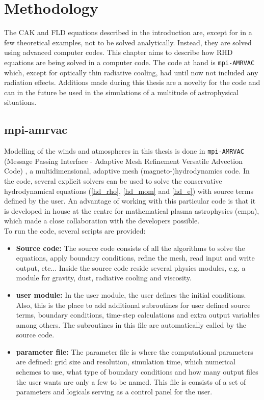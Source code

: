 \chapter{Methodology}
The CAK and FLD equations described in the introduction are, except for in a few theoretical examples, not to be solved analytically. Instead, they are solved using advanced computer codes. This chapter aims to describe how RHD equations are being solved in a computer code. The code at hand is \texttt{mpi-AMRVAC} which, except for optically thin radiative cooling, had until now not included any radiation effects. Additions made during this thesis are a novelty for the code and can in the future be used in the simulations of a multitude of astrophysical situations.

\section{mpi-amrvac} \label{section: methods amrvac}
Modelling of the winds and atmospheres in this thesis is done in \texttt{mpi-AMRVAC} (Message Passing Interface - Adaptive Mesh Refinement Versatile Advection Code) \citep{Porth2014}, a multidimensional, adaptive mesh (magneto-)hydrodynamics code. In the code, several explicit solvers can be used to solve the conservative hydrodynamical equations (\eqref{hd_rho}, \eqref{hd_mom} and \eqref{hd_e}) with source terms defined by the user. An advantage of working with this particular code is that it is developed in house at the centre for mathematical plasma astrophysics (cmpa), which made a close collaboration with the developers possible.\\
To run the code, several scripts are provided:

\begin{itemize}
\item \textbf{Source code:} The source code consists of all the algorithms to solve the equations, apply boundary conditions, refine the mesh, read input and write output, etc... Inside the source code reside several physics modules, e.g. a module for gravity, dust, radiative cooling and viscosity.\\

\item \textbf{user module:} In the user module, the user defines the initial conditions. Also, this is the place to add additional subroutines for user defined source terms, boundary conditions, time-step calculations and extra output variables among others. The subroutines in this file are automatically called by the source code.\\

\item \textbf{parameter file:} The parameter file is where the computational parameters are defined: grid size and resolution, simulation time, which numerical schemes to use, what type of boundary conditions and how many output files the user wants are only a few to be named. This file is consists of a set of parameters and logicals serving as a control panel for the user.\\
\end{itemize}

